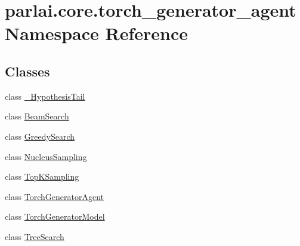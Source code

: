 \hypertarget{namespaceparlai_1_1core_1_1torch__generator__agent}{}\section{parlai.\+core.\+torch\+\_\+generator\+\_\+agent Namespace Reference}
\label{namespaceparlai_1_1core_1_1torch__generator__agent}
\subsection*{Classes}
\begin{DoxyCompactItemize}
\item 
class \hyperlink{classparlai_1_1core_1_1torch__generator__agent_1_1__HypothesisTail}{\+\_\+\+Hypothesis\+Tail}
\item 
class \hyperlink{classparlai_1_1core_1_1torch__generator__agent_1_1BeamSearch}{Beam\+Search}
\item 
class \hyperlink{classparlai_1_1core_1_1torch__generator__agent_1_1GreedySearch}{Greedy\+Search}
\item 
class \hyperlink{classparlai_1_1core_1_1torch__generator__agent_1_1NucleusSampling}{Nucleus\+Sampling}
\item 
class \hyperlink{classparlai_1_1core_1_1torch__generator__agent_1_1TopKSampling}{Top\+K\+Sampling}
\item 
class \hyperlink{classparlai_1_1core_1_1torch__generator__agent_1_1TorchGeneratorAgent}{Torch\+Generator\+Agent}
\item 
class \hyperlink{classparlai_1_1core_1_1torch__generator__agent_1_1TorchGeneratorModel}{Torch\+Generator\+Model}
\item 
class \hyperlink{classparlai_1_1core_1_1torch__generator__agent_1_1TreeSearch}{Tree\+Search}
\end{DoxyCompactItemize}
